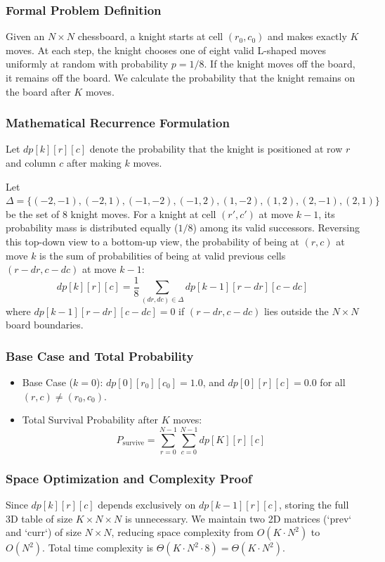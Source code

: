 \documentclass[10pt,journal,compsoc,onecolumn]{IEEEtran}
\begin{document}
\subsubsection{Formal Problem Definition}
Given an $N \times N$ chessboard, a knight starts at cell $(r_0, c_0)$ and makes exactly $K$ moves. At each step, the knight chooses one of eight valid L-shaped moves uniformly at random with probability $p = 1/8$. If the knight moves off the board, it remains off the board. We calculate the probability that the knight remains on the board after $K$ moves.

\subsubsection{Mathematical Recurrence Formulation}
Let $dp[k][r][c]$ denote the probability that the knight is positioned at row $r$ and column $c$ after making $k$ moves.

Let $\Delta = \{(-2,-1), (-2,1), (-1,-2), (-1,2), (1,-2), (1,2), (2,-1), (2,1)\}$ be the set of 8 knight moves. For a knight at cell $(r', c')$ at move $k-1$, its probability mass is distributed equally ($1/8$) among its valid successors. Reversing this top-down view to a bottom-up view, the probability of being at $(r, c)$ at move $k$ is the sum of probabilities of being at valid previous cells $(r - dr, c - dc)$ at move $k-1$:
\begin{equation}
dp[k][r][c] = \frac{1}{8} \sum_{(dr, dc) \in \Delta} dp[k-1][r - dr][c - dc]
\label{eq:knight-rec}
\end{equation}
where $dp[k-1][r-dr][c-dc] = 0$ if $(r-dr, c-dc)$ lies outside the $N \times N$ board boundaries.

\subsubsection{Base Case and Total Probability}
\begin{itemize}
    \item Base Case ($k = 0$): $dp[0][r_0][c_0] = 1.0$, and $dp[0][r][c] = 0.0$ for all $(r,c) \neq (r_0, c_0)$.
    \item Total Survival Probability after $K$ moves:
    \[
    P_{\text{survive}} = \sum_{r=0}^{N-1} \sum_{c=0}^{N-1} dp[K][r][c]
    \]
\end{itemize}

\subsubsection{Space Optimization and Complexity Proof}
Since $dp[k][r][c]$ depends exclusively on $dp[k-1][r][c]$, storing the full 3D table of size $K \times N \times N$ is unnecessary. We maintain two 2D matrices (`prev` and `curr`) of size $N \times N$, reducing space complexity from $O(K \cdot N^2)$ to $O(N^2)$. Total time complexity is $\Theta(K \cdot N^2 \cdot 8) = \Theta(K \cdot N^2)$.
\end{document}
